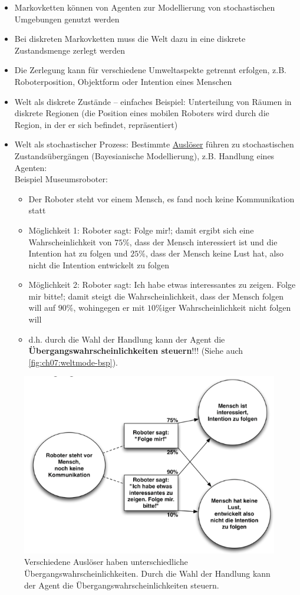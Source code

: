 \begin{itemize}
	\item Markovketten k\"onnen von Agenten zur Modellierung von stochastischen Umgebungen genutzt werden
	\item Bei diskreten Markovketten muss die Welt dazu in eine diskrete Zustandsmenge zerlegt werden
	\item Die Zerlegung kann f\"ur verschiedene Umweltaspekte getrennt erfolgen, z.B. Roboterposition, Objektform oder Intention eines Menschen
	\item Welt als diskrete Zust\"ande -- einfaches Beispiel: Unterteilung von R\"aumen in diskrete Regionen (die Position eines mobilen Roboters wird durch die Region, in der er sich befindet, repr\"asentiert)
	\item Welt als stochastischer Prozess: Bestimmte \underline{Ausl\"oser} f\"uhren zu stochastischen Zustands\"uberg\"angen (Bayesianische Modellierung), z.B. Handlung eines Agenten:\\ Beispiel Museumsroboter:
	\begin{itemize}
		\item Der Roboter steht vor einem Mensch, es fand noch keine Kommunikation statt
		\item M\"oglichkeit 1: Roboter sagt: Folge mir!; damit ergibt sich eine Wahrscheinlichkeit von $75\%$, dass der Mensch interessiert ist und die Intention hat zu folgen und $25\%$, dass der Mensch keine Lust hat, also nicht die Intention entwickelt zu folgen
		\item M\"oglichkeit 2: Roboter sagt: Ich habe etwas interessantes zu zeigen. Folge mir bitte!; damit steigt die Wahrscheinlichkeit, dass der Mensch folgen will auf $90\%$, wohingegen er mit $10\%$iger Wahrscheinlichkeit nicht folgen will
		\item d.h. durch die Wahl der Handlung kann der Agent die \textbf{\"Ubergangswahrscheinlichkeiten steuern}!!! (Siehe auch \autoref{fig:ch07:weltmode-bsp}).
	\end{itemize}
\end{itemize}
\begin{figure}[!h]
	\centering
  	\includegraphics[width=0.5\linewidth]{figures/ch07_weltmode-bsp.png}
	\caption{Verschiedene Auslöser haben unterschiedliche Übergangswahrscheinlichkeiten. Durch die Wahl der Handlung kann der Agent die Übergangswahrscheinlichkeiten steuern.}
	\label{fig:ch07:weltmode-bsp}
\end{figure}
